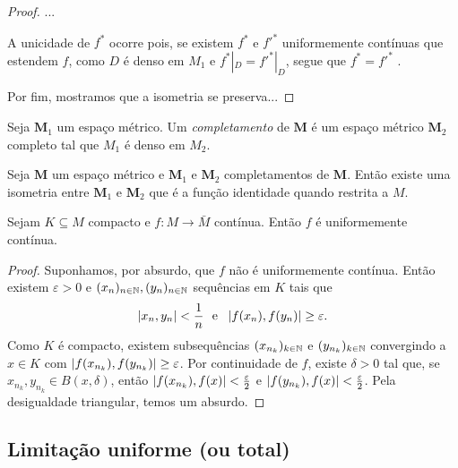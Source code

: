 \begin{proof}
...

	A unicidade de $f^*$ ocorre pois, se existem $f^*$ e $f'^*$ uniformemente contínuas que estendem $f$, como $D$ é denso em $M_1$ e $f^*|_D = f'^*|_D$, segue que $f^* = f'^*$ .
	
	Por fim, mostramos que a isometria se preserva...
\end{proof}

\begin{definition}
Seja $\bm M_1$  um espaço métrico. Um \emph{completamento} de $\bm M$ é um espaço métrico $\bm M_2$ completo tal que $M_1$ é denso em $M_2$.
\end{definition}

\begin{exercise}
Seja $\bm M$ um espaço métrico e $\bm M_1$ e $\bm M_2$ completamentos de $\bm M$. Então existe uma isometria entre $\bm M_1$ e $\bm M_2$ que é a função identidade quando restrita a $M$.
\end{exercise}
%	


\begin{proposition}
Sejam $K \subseteq M$ compacto e $f: M \to \bar M$ contínua. Então $f$ é uniformemente contínua.
\end{proposition}
\begin{proof}
Suponhamos, por absurdo, que $f$ não é uniformemente contínua. Então existem $\varepsilon > 0$ e $(x_n)_{n \in \mathbb{N}},(y_n)_{n \in \mathbb{N}}$ sequências em $K$ tais que
	\begin{equation*}
	\left\vert{x_n},{y_n}\right\vert < \frac{1}{n} \text{\ \ e\ \ } \left\vert{f(x_n)},{f(y_n)}\right\vert \geq \varepsilon.
	\end{equation*}
Como $K$ é compacto, existem subsequências $(x_{n_k})_{k \in \mathbb{N}}$  e $(y_{n_k})_{k \in \mathbb{N}}$ convergindo a $x \in K$ com $\left\vert{f(x_{n_k})},{f(y_{n_k})}\right\vert \geq \varepsilon$. Por continuidade de $f$, existe $\delta > 0$ tal que, se $x_{n_k},y_{n_k} \in B(x,\delta)$, então $\left\vert{f(x_{n_k})},{f(x)}\right\vert < \frac{\varepsilon}{2}$ e $\left\vert{f(y_{n_k})},{f(x)}\right\vert < \frac{\varepsilon}{2}$. Pela desigualdade triangular, temos um absurdo.
\end{proof}


\subsection{Limitação uniforme (ou total)}

